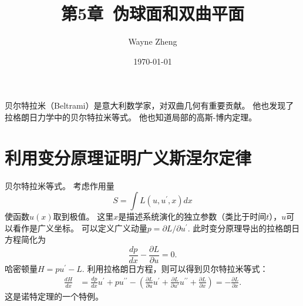 \documentclass{article}
\title{第5章~伪球面和双曲平面}
\author{Wayne Zheng}
\date{\today}
\begin{document}
\maketitle

贝尔特拉米（Beltrami）是意大利数学家，对双曲几何有重要贡献。
他也发现了拉格朗日力学中的贝尔特拉米等式。
他也知道局部的高斯-博内定理。

\section{利用变分原理证明广义斯涅尔定律}

\begin{tcolorbox}[colback=white, arc=3mm, auto outer arc]
\begin{minipage}[c,t]{1.0\textwidth}
\kaishu
贝尔特拉米等式。
考虑作用量
\begin{equation*}
    S=\int{L}(u, u^{\prime}, x)dx
\end{equation*}
使函数$u(x)$取到极值。
这里$x$是描述系统演化的独立参数（类比于时间$t$），$u$可以看作是广义坐标。
可以定义广义动量$p=\partial{L}/\partial{u^{\prime}}$.
此时变分原理导出的拉格朗日方程简化为
\begin{equation*}
    \frac{dp}{dx}-\frac{\partial{L}}{\partial{u}}=0.
\end{equation*}
哈密顿量$H=pu^{\prime}-L$.
利用拉格朗日方程，则可以得到贝尔特拉米等式：
\begin{equation*}
\begin{aligned}
\frac{dH}{dx}
&=\frac{dp}{dx}u^{\prime}+pu^{\prime\prime}-\left(\frac{\partial{L}}{\partial{u}}u^{\prime}+\frac{\partial{L}}{\partial{u\prime}}u^{\prime\prime}+\frac{\partial{L}}{\partial{x}}\right)=-\frac{\partial{L}}{\partial{x}}.
\end{aligned}
\end{equation*}
这是诺特定理的一个特例。
\end{minipage}
\end{tcolorbox}

%
%
\end{document}
